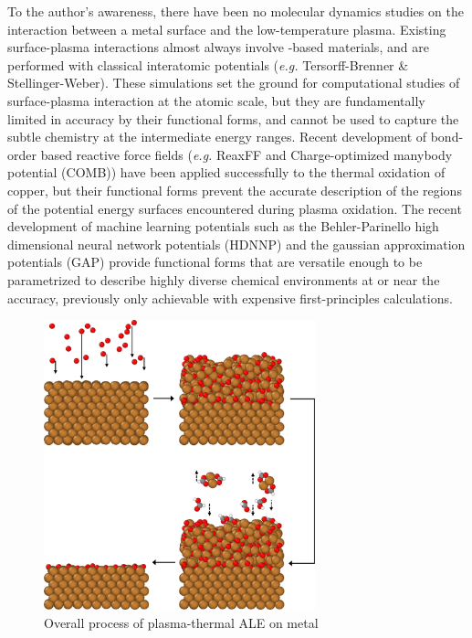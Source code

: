 \documentclass[manuscript=cmatex]{achemso}
\begin{document}
To the author's awareness, there have been no molecular dynamics studies on the interaction between a metal surface and the low-temperature plasma. Existing surface-plasma interactions almost always involve -based materials, and are performed with classical interatomic potentials (\textit{e.g.} Tersorff-Brenner \& Stellinger-Weber). These simulations set the ground for computational studies of surface-plasma interaction at the atomic scale, but they are fundamentally limited in accuracy by their functional forms, and cannot be used to capture the subtle chemistry at the intermediate energy ranges. Recent development of bond-order based reactive force fields (\textit{e.g.} ReaxFF and Charge-optimized manybody potential (COMB)) have been applied successfully to the thermal oxidation of copper, but their functional forms prevent the accurate description of the regions of the potential energy surfaces encountered during plasma oxidation. The recent development of machine learning potentials such as the Behler-Parinello high dimensional neural network potentials (HDNNP) and the gaussian approximation potentials (GAP) provide functional forms that are versatile enough to be parametrized to describe highly diverse chemical environments at or near the accuracy, previously only achievable with expensive first-principles calculations. 

\begin{figure}[h]
  \centering
  \includegraphics[width=0.7\textwidth]{scheme}
  \caption[Overall process of plasma-thermal ALE on  metal]{Overall process of plasma-thermal ALE on  metal}
  \label{fig:scheme}
\end{figure}
\end{document}
